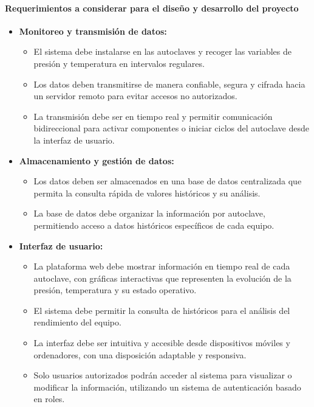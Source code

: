 \paragraph{Requerimientos a considerar para el diseño y desarrollo del proyecto}
\begin{itemize}
    \item \textbf{Monitoreo y transmisión de datos:}
    \begin{itemize}
        \item El sistema debe instalarse en las autoclaves y recoger las variables de presión y temperatura en intervalos regulares.
        \item Los datos deben transmitirse de manera confiable, segura y cifrada hacia un servidor remoto para evitar accesos no autorizados.
        \item La transmisión debe ser en tiempo real y permitir comunicación bidireccional para activar componentes o iniciar ciclos del autoclave desde la interfaz de usuario.
    \end{itemize}

    \item \textbf{Almacenamiento y gestión de datos:}
    \begin{itemize}
        \item Los datos deben ser almacenados en una base de datos centralizada que permita la consulta rápida de valores históricos y su análisis.
        \item La base de datos debe organizar la información por autoclave, permitiendo acceso a datos históricos específicos de cada equipo.
    \end{itemize}
    
    \item \textbf{Interfaz de usuario:}
    \begin{itemize}
        \item La plataforma web debe mostrar información en tiempo real de cada autoclave, con gráficas interactivas que representen la evolución de la presión, temperatura y su estado operativo.
        \item El sistema debe permitir la consulta de históricos para el análisis del rendimiento del equipo.
        \item La interfaz debe ser intuitiva y accesible desde dispositivos móviles y ordenadores, con una disposición adaptable y responsiva.
        \item Solo usuarios autorizados podrán acceder al sistema para visualizar o modificar la información, utilizando un sistema de autenticación basado en roles.
    \end{itemize}


\end{itemize}
